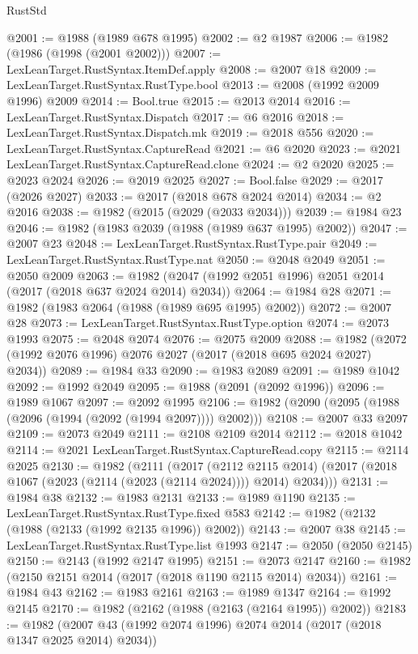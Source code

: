 \begin{lexlean}{RustStd}
\begin{coremodule}
@2001 := @1988 (@1989 @678 @1995)
@2002 := @2 @1987
@2006 := @1982 (@1986 (@1998 (@2001 @2002)))
@2007 := LexLeanTarget.RustSyntax.ItemDef.apply
@2008 := @2007 @18
@2009 := LexLeanTarget.RustSyntax.RustType.bool
@2013 := @2008 (@1992 @2009 @1996) @2009
@2014 := Bool.true
@2015 := @2013 @2014
@2016 := LexLeanTarget.RustSyntax.Dispatch
@2017 := @6 @2016
@2018 := LexLeanTarget.RustSyntax.Dispatch.mk
@2019 := @2018 @556
@2020 := LexLeanTarget.RustSyntax.CaptureRead
@2021 := @6 @2020
@2023 := @2021 LexLeanTarget.RustSyntax.CaptureRead.clone
@2024 := @2 @2020
@2025 := @2023 @2024
@2026 := @2019 @2025
@2027 := Bool.false
@2029 := @2017 (@2026 @2027)
@2033 := @2017 (@2018 @678 @2024 @2014)
@2034 := @2 @2016
@2038 := @1982 (@2015 (@2029 (@2033 @2034)))
@2039 := @1984 @23
@2046 := @1982 (@1983 @2039 (@1988 (@1989 @637 @1995) @2002))
@2047 := @2007 @23
@2048 := LexLeanTarget.RustSyntax.RustType.pair
@2049 := LexLeanTarget.RustSyntax.RustType.nat
@2050 := @2048 @2049
@2051 := @2050 @2009
@2063 := @1982 (@2047 (@1992 @2051 @1996) @2051 @2014 (@2017 (@2018 @637 @2024 @2014) @2034))
@2064 := @1984 @28
@2071 := @1982 (@1983 @2064 (@1988 (@1989 @695 @1995) @2002))
@2072 := @2007 @28
@2073 := LexLeanTarget.RustSyntax.RustType.option
@2074 := @2073 @1993
@2075 := @2048 @2074
@2076 := @2075 @2009
@2088 := @1982 (@2072 (@1992 @2076 @1996) @2076 @2027 (@2017 (@2018 @695 @2024 @2027) @2034))
@2089 := @1984 @33
@2090 := @1983 @2089
@2091 := @1989 @1042
@2092 := @1992 @2049
@2095 := @1988 (@2091 (@2092 @1996))
@2096 := @1989 @1067
@2097 := @2092 @1995
@2106 := @1982 (@2090 (@2095 (@1988 (@2096 (@1994 (@2092 (@1994 @2097)))) @2002)))
@2108 := @2007 @33 @2097
@2109 := @2073 @2049
@2111 := @2108 @2109 @2014
@2112 := @2018 @1042
@2114 := @2021 LexLeanTarget.RustSyntax.CaptureRead.copy
@2115 := @2114 @2025
@2130 := @1982
    (@2111
      (@2017
        (@2112 @2115 @2014)
        (@2017 (@2018 @1067 (@2023 (@2114 (@2023 (@2114 @2024)))) @2014) @2034)))
@2131 := @1984 @38
@2132 := @1983 @2131
@2133 := @1989 @1190
@2135 := LexLeanTarget.RustSyntax.RustType.fixed @583
@2142 := @1982 (@2132 (@1988 (@2133 (@1992 @2135 @1996)) @2002))
@2143 := @2007 @38
@2145 := LexLeanTarget.RustSyntax.RustType.list @1993
@2147 := @2050 (@2050 @2145)
@2150 := @2143 (@1992 @2147 @1995)
@2151 := @2073 @2147
@2160 := @1982 (@2150 @2151 @2014 (@2017 (@2018 @1190 @2115 @2014) @2034))
@2161 := @1984 @43
@2162 := @1983 @2161
@2163 := @1989 @1347
@2164 := @1992 @2145
@2170 := @1982 (@2162 (@1988 (@2163 (@2164 @1995)) @2002))
@2183 := @1982 (@2007 @43 (@1992 @2074 @1996) @2074 @2014 (@2017 (@2018 @1347 @2025 @2014) @2034))

\end{coremodule}
\end{lexlean}

